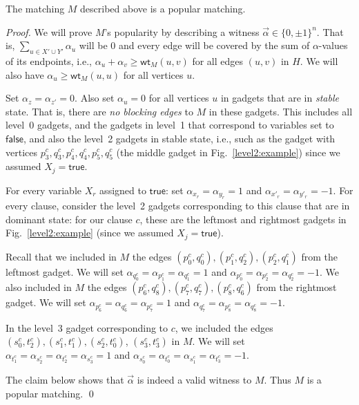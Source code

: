 \documentclass{llncs}
\newcommand{\wt}{\mathsf{wt}}
\begin{document}
\begin{theorem}
  The matching $M$ described above is a popular matching.
\end{theorem}
\begin{proof}
  We will prove $M$'s popularity by describing a witness $\vec{\alpha} \in \{0,\pm 1\}^n$. That is, $\sum_{u\in X'\cup Y'} \alpha_u$ will be 0 and every edge will be
  covered by the sum of $\alpha$-values of its endpoints, i.e., $\alpha_u + \alpha_v \ge \wt_M(u,v)$ for all edges $(u,v)$ in $H$. We will also have
  $\alpha_u \ge \wt_M(u,u)$ for all vertices $u$.

  Set $\alpha_z = \alpha_{z'} = 0$. Also set $\alpha_u = 0$ for all vertices $u$ in gadgets that are in {\em stable} state. That is, there are 
  {\em no blocking edges} to $M$ in these gadgets. This includes all level~0 gadgets,
  and the gadgets in level~1 that correspond to variables set to $\mathsf{false}$, and also the level~2 gadgets in stable state, i.e.,
  such as the gadget with vertices $p^c_3,q^c_3,p^c_4,q^c_4,p^c_5,q^c_5$ (the middle gadget in Fig.~\ref{level2:example}) since we assumed $X_j = \mathsf{true}$.

  \smallskip

  For every variable $X_r$ assigned to $\mathsf{true}$: set $\alpha_{x_r} = \alpha_{y_r} = 1$ and $\alpha_{x'_r} = \alpha_{y'_r} = -1$.
  For every clause, consider the level~2 gadgets corresponding to this clause that are in dominant state:
  for our clause $c$, these are the leftmost and rightmost gadgets in Fig.~\ref{level2:example} (since we assumed $X_j = \mathsf{true}$).

  Recall that we included in $M$ the edges $(p^c_0,q^c_0),(p^c_1,q^c_2),(p^c_2,q^c_1)$ from the leftmost gadget.
  We will set $\alpha_{q^c_0} = \alpha_{p^c_1} = \alpha_{q^c_1} = 1$ and $\alpha_{p^c_0} = \alpha_{p^c_2} = \alpha_{q^c_2} = -1$.
  We also included in $M$ the edges $(p^c_6,q^c_8),(p^c_7,q^c_7),(p^c_8,q^c_6)$ from the rightmost gadget.
  We will set $\alpha_{p^c_6} = \alpha_{q^c_6} = \alpha_{p^c_7} = 1$ and $\alpha_{q^c_7} = \alpha_{p^c_8} = \alpha_{q^c_8} = -1$.

  In the level~3 gadget corresponding to $c$, we included the edges $(s^c_0,t^c_2), (s^c_1,t^c_1),(s^c_2,t^c_0)$, $(s^c_3,t^c_3)$ in $M$.
  We will set $\alpha_{t^c_1} = \alpha_{s^c_2} = \alpha_{t^c_2} = \alpha_{s^c_3} = 1$ and $\alpha_{s^c_0} = \alpha_{t^c_0} = \alpha_{s^c_1} = \alpha_{t^c_3} = -1$.

  The claim below shows that $\vec{\alpha}$ is indeed a valid witness to $M$. Thus $M$ is a popular matching. \qed
 \end{proof}
\end{document}
